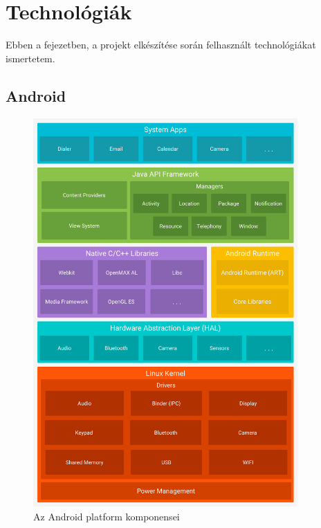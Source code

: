 \chapter{Technológiák}

\begin{osszefoglal}
	Ebben a fejezetben, a projekt elkészítése során felhasznált technológiákat ismertetem.
	
\end{osszefoglal}

\section{Android}

\begin{figure}
	\centering
	\setlength{\abovecaptionskip}{0pt}
	\setlength{\belowcaptionskip}{0pt}
	\includegraphics[width=0.9\textwidth, scale=0.9]{images/android}
	\caption{Az Android platform komponensei\label{fig:ALAP:sm2}}
\end{figure}

